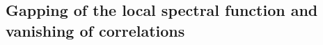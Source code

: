 \documentclass[reprint,hidelinks,onecolumn]{revtex4-2}
\begin{document}
\subsection{Gapping of the local spectral function and vanishing of correlations}
%
%
%
\end{document}
